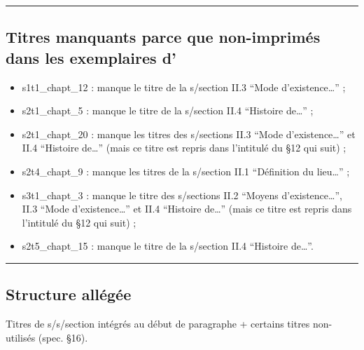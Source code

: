 \begin{center}\rule{3in}{0.4pt}\end{center}

\subsection[Titres non-imprimés]{Titres manquants parce que non-imprimés dans les exemplaires
d'\ia}\label{ann:titre-non-imprimes}

\begin{itemize}
\item
  s1t1\_chapt\_12 : manque le titre de la s/section II.3 ``Mode
  d'existence\ldots{}'' ;
\item
  s2t1\_chapt\_5 : manque le titre de la s/section II.4 ``Histoire
  de\ldots{}'' ;
\item
  s2t1\_chapt\_20 : manque les titres des s/sections II.3 ``Mode
  d'existence\ldots{}'' et II.4 ``Histoire de\ldots{}'' (mais ce titre
  est repris dans l'intitulé du §12 qui suit) ;
\item
  s2t4\_chapt\_9 : manque les titres de la s/section II.1 ``Définition
  du lieu\ldots{}'' ;
\item
  s3t1\_chapt\_3 : manque le titre des s/sections II.2 ``Moyens
  d'existence\ldots{}'', II.3 ``Mode d'existence\ldots{}'' et II.4
  ``Histoire de\ldots{}'' (mais ce titre est repris dans l'intitulé du
  §12 qui suit) ;
\item
  s2t5\_chapt\_15 : manque le titre de la s/section II.4 ``Histoire
  de\ldots{}''.
\end{itemize}

\begin{center}\rule{3in}{0.4pt}\end{center}

\subsection{Structure allégée}\label{ann:structure-allegee}

Titres de s/s/section intégrés au début de paragraphe + certains titres
non-utilisés (spec. §16).


